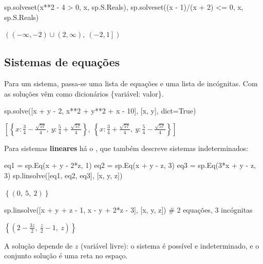 \begin{entrada}
sp.solveset(x**2 - 4 > 0, x, sp.S.Reals), sp.solveset((x - 1)/(x + 2) <= 0, x, sp.S.Reals)
\end{entrada}
\begin{saidamat}
$\displaystyle \left( \left(-\infty, -2\right) \cup \left(2, \infty\right), \  \left(-2, 1\right]\right)$
\end{saidamat}

\subsection{Sistemas de equações}

Para um sistema, passa-se uma lista de equações e uma lista de incógnitas. Com  as soluções vêm
como dicionários \{variável: valor\}.

\begin{entrada}
sp.solve([x + y - 2, x**2 + y**2 + x - 10], [x, y], dict=True)
\end{entrada}
\begin{saidamat}
$\displaystyle \left[ \left\{ x : \frac{3}{4} - \frac{\sqrt{57}}{4}, \  y : \frac{5}{4} + \frac{\sqrt{57}}{4}\right\}, \  \left\{ x : \frac{3}{4} + \frac{\sqrt{57}}{4}, \  y : \frac{5}{4} - \frac{\sqrt{57}}{4}\right\}\right]$
\end{saidamat}

Para sistemas \textbf{lineares} há o , que também descreve sistemas indeterminados:

\begin{entrada}
eq1 = sp.Eq(x + y - 2*z, 1)
eq2 = sp.Eq(x + y - z, 3)
eq3 = sp.Eq(3*x + y - z, 3)
sp.linsolve([eq1, eq2, eq3], [x, y, z])
\end{entrada}
\begin{saidamat}
$\displaystyle \left\{\left( 0, \  5, \  2\right)\right\}$
\end{saidamat}

\begin{entrada}
sp.linsolve([x + y + z - 1, x - y + 2*z - 3], [x, y, z])     # 2 equações, 3 incógnitas
\end{entrada}
\begin{saidamat}
$\displaystyle \left\{\left( 2 - \frac{3 z}{2}, \  \frac{z}{2} - 1, \  z\right)\right\}$
\end{saidamat}

A solução depende de $z$ (variável livre): o sistema é possível e indeterminado, e o conjunto solução é uma reta
no espaço.

